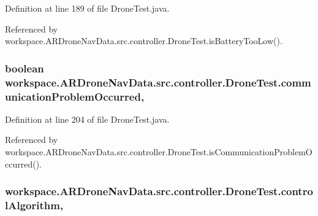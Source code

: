 Definition at line 189 of file Drone\+Test.\+java.



Referenced by workspace.\+A\+R\+Drone\+Nav\+Data.\+src.\+controller.\+Drone\+Test.\+is\+Battery\+Too\+Low().

\hypertarget{classworkspace_1_1_a_r_drone_nav_data_1_1src_1_1controller_1_1_drone_test_ad6c952a7cd89d9d2ba82b57ca7fd1b5a}{}
\subsubsection[{communication\+Problem\+Occurred}]{\setlength{\rightskip}{0pt plus 5cm}boolean workspace.\+A\+R\+Drone\+Nav\+Data.\+src.\+controller.\+Drone\+Test.\+communication\+Problem\+Occurred\hspace{0.3cm}{\ttfamily [static]}, {\ttfamily [protected]}}\label{classworkspace_1_1_a_r_drone_nav_data_1_1src_1_1controller_1_1_drone_test_ad6c952a7cd89d9d2ba82b57ca7fd1b5a}


Definition at line 204 of file Drone\+Test.\+java.



Referenced by workspace.\+A\+R\+Drone\+Nav\+Data.\+src.\+controller.\+Drone\+Test.\+is\+Communication\+Problem\+Occurred().

\hypertarget{classworkspace_1_1_a_r_drone_nav_data_1_1src_1_1controller_1_1_drone_test_a7745982aa5edaa0602d42c16c4161eaa}{}
\subsubsection[{control\+Algorithm}]{ workspace.\+A\+R\+Drone\+Nav\+Data.\+src.\+controller.\+Drone\+Test.\+control\+Algorithm\hspace{0.3cm}{\ttfamily [static]}, {\ttfamily [protected]}}\label{classworkspace_1_1_a_r_drone_nav_data_1_1src_1_1controller_1_1_drone_test_a7745982aa5edaa0602d42c16c4161eaa}


